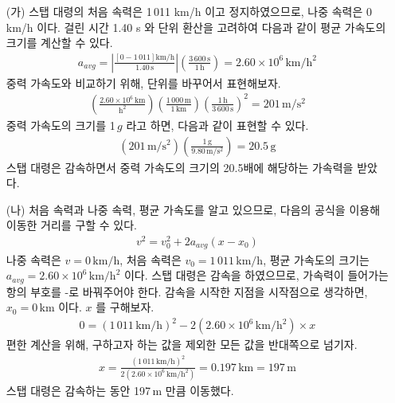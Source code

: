 \documentclass[APS,floatfix,nofootinbib,superscriptaddress,fleqn,preprint]{revtex4}
\begin{document}
\begin{itemize}
  \item [(가)] 스탭 대령의 처음 속력은 1\,011 km/h 이고 정지하였으므로, 나중 속력은 0 km/h 이다. 걸린 시간 1.40 s 와 단위 환산을 고려하여 다음과 같이 평균 가속도의 크기를 계산할 수 있다.
  \begin{align}
    a_{avg} = \left|\frac{[0-1\,011]\mathrm{km/h}}{1.40 \,\mathrm{s}}\right|\left(\frac{3\,600\,\mathrm{s}}{1\,\mathrm{h}}\right)=2.60\times 10^6\,\mathrm{km/h^2}
  \end{align} 
  중력 가속도와 비교하기 위해, 단위를 바꾸어서 표현해보자.
  \begin{align}
    \left(\mathrm{\frac{2.60\times 10^6\,km}{h^2}}\right)\left(\mathrm{\frac{1\,000\,m}{1\,km}}\right)\mathrm{\left(\frac{1\,h}{3\,600\,s}\right)^2}=201\,\mathrm{m/s^2}
  \end{align}
  중력 가속도의 크기를 1\,$g$ 라고 하면, 다음과 같이 표현할 수 있다.
  \begin{align}
  \left(\mathrm{201\,m/s^2}\right)\left(\frac{1\,\mathrm{g}}{9.80\,\mathrm{m/s^2}}\right) = 20.5\,\mathrm{g}
  \end{align} 
  스탭 대령은 감속하면서 중력 가속도의 크기의 20.5배에 해당하는 가속력을 받았다.
  \item [(나)] 처음 속력과 나중 속력, 평균 가속도를 알고 있으므로, 다음의 공식을 이용해 이동한 거리를 구할 수 있다.
  \begin{align}
    v^2=v_0^2+2a_{avg}(x-x_0)
  \end{align}
  나중 속력은 $v=\mathrm{0\,km/h}$, 처음 속력은 $v_0=\mathrm{1\,011\,km/h}$, 평균 가속도의 크기는 $a_{avg}=2.60\times 10^6\,\mathrm{km/h^2}$ 이다. 스탭 대령은 감속을 하였으므로, 가속력이 들어가는 항의 부호를 -로 바꿔주어야 한다. 감속을 시작한 지점을 시작점으로 생각하면, $x_0=0\,\mathrm{km}$ 이다. $x$ 를 구해보자.
  \begin{align}
    0=\left(\mathrm{1\,011\,km/h}\right)^2-2\left(2.60\times 10^6\,\mathrm{km/h^2}\right)\times x
  \end{align}    
  편한 계산을 위해, 구하고자 하는 값을 제외한 모든 값을 반대쪽으로 넘기자.
  \begin{align}    
    x=\frac{\left(\mathrm{1\,011\,km/h}\right)^2}{2\left(2.60\times 10^6\,\mathrm{km/h^2}\right)}=0.197\,\mathrm{km}=197\,\mathrm{m}
  \end{align}
  스탭 대령은 감속하는 동안 197\,m 만큼 이동했다.
\end{itemize}

\newpage
\end{document}

